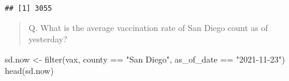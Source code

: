 \documentclass[
]{article}
\newenvironment{Shaded}{\begin{snugshade}}{\end{snugshade}}
\newcommand{\FunctionTok}[1]{\textcolor[rgb]{0.00,0.00,0.00}{#1}}
\newcommand{\NormalTok}[1]{#1}
\newcommand{\OtherTok}[1]{\textcolor[rgb]{0.56,0.35,0.01}{#1}}
\newcommand{\SpecialCharTok}[1]{\textcolor[rgb]{0.00,0.00,0.00}{#1}}
\newcommand{\StringTok}[1]{\textcolor[rgb]{0.31,0.60,0.02}{#1}}
\begin{document}
\begin{verbatim}
## [1] 3055
\end{verbatim}

\begin{quote}
Q. What is the average vaccination rate of San Diego count as of
yesterday?
\end{quote}

\begin{Shaded}
\begin{Highlighting}[]
\NormalTok{sd.now }\OtherTok{\textless{}{-}} \FunctionTok{filter}\NormalTok{(vax, county }\SpecialCharTok{==} \StringTok{"San Diego"}\NormalTok{, as\_of\_date }\SpecialCharTok{==} \StringTok{"2021{-}11{-}23"}\NormalTok{)}
\FunctionTok{head}\NormalTok{(sd.now)}
\end{Highlighting}
\end{Shaded}
\end{document}
